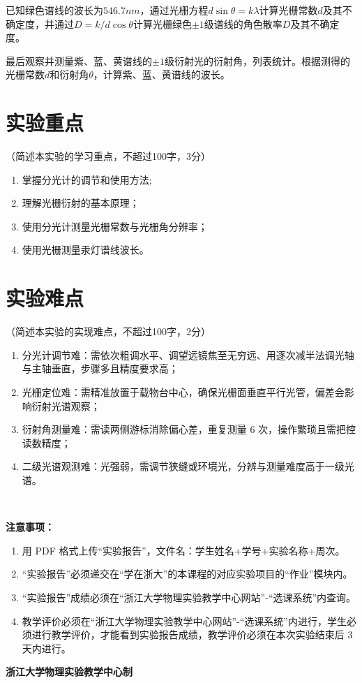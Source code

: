 \documentclass[10pt,a4paper]{ctexart}
\newcommand{\sihao}{\fontsize{14pt}{18pt}\selectfont}
\newcommand{\xiaosi}{\fontsize{12pt}{16pt}\selectfont}
\begin{document}
    已知绿色谱线的波长为$546.7nm$，通过光栅方程$d \sin \theta  = k \lambda $计算光栅常数$d$及其不确定度，并通过$D=k/d \cos\theta $计算光栅绿色$\pm 1$级谱线的角色散率$D$及其不确定度。

    最后观察并测量紫、蓝、黄谱线的$\pm 1$级衍射光的衍射角，列表统计。根据测得的光栅常数$d$和衍射角$\theta $，计算紫、蓝、黄谱线的波长。
   
    
    \section{实验重点}

    \xiaosi（简述本实验的学习重点，不超过100字，3分）


    \begin{enumerate}   
        \item 掌握分光计的调节和使用方法;
        \item 理解光栅衍射的基本原理；
        \item 使用分光计测量光栅常数与光栅角分辨率；
        \item 使用光栅测量汞灯谱线波长。

    \end{enumerate}  
    
    
    \section{实验难点}
    
    \xiaosi（简述本实验的实现难点，不超过100字，2分）

    \begin{enumerate}    
        \item 分光计调节难：需依次粗调水平、调望远镜焦至无穷远、用逐次减半法调光轴与主轴垂直，步骤多且精度要求高；
        \item 光栅定位难：需精准放置于载物台中心，确保光栅面垂直平行光管，偏差会影响衍射光谱观察；
        \item 衍射角测量难：需读两侧游标消除偏心差，重复测量 6 次，操作繁琐且需把控读数精度；
        \item 二级光谱观测难：光强弱，需调节狭缝或环境光，分辨与测量难度高于一级光谱。
    \end{enumerate}  \



\newpage

\sihao\textbf{注意事项：}
\xiaosi
\begin{enumerate}
    \item  用 PDF 格式上传“实验报告”，文件名：学生姓名+学号+实验名称+周次。
    \item  “实验报告”必须递交在“学在浙大”的本课程的对应实验项目的“作业”模块内。
    \item  “实验报告”成绩必须在“浙江大学物理实验教学中心网站”-“选课系统”内查询。
    \item 教学评价必须在“浙江大学物理实验教学中心网站”-“选课系统”内进行，学生必须进行教学评价，才能看到实验报告成绩，教学评价必须在本次实验结束后 3 天内进行。
\end{enumerate}

\vspace{1cm}
\xiaosi\centering \textbf{浙江大学物理实验教学中心制}
\end{document}
